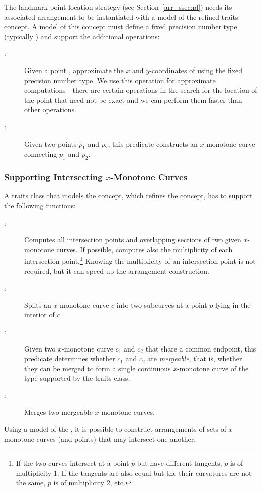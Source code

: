 The landmark point-location strategy (see
Section~\ref{arr_ssec:pl}) needs its associated arrangement to be
instantiated with a model of the refined
 traits concept. A model of this
concept must define a fixed precision number type (typically
) and support the additional operations:
\begin{description}
\item[:]
  Given a point , approximate the $x$ and $y$-coordinates
  of  using the fixed precision number type. We use this
  operation for approximate computations---there are certain
  operations in the search for the location of the point that need not
  be exact and we can perform them faster than other operations.
%
\item[:] Given two points $p_1$ and
  $p_2$, this predicate constructs an $x$-monotone curve connecting
  $p_1$ and $p_2$.
\end{description}

\subsubsection{Supporting Intersecting $x$-Monotone Curves
\label{arr_sssec:tr_xmon_concept}}

A traits class that models the 
concept, which refines the 
concept, has to support the following functions:
\begin{description}
\item[:]
  Computes all intersection points and overlapping sections of
  two given $x$-monotone curves. If possible, computes also the
  multiplicity of each intersection point.\footnote{If the two
    curves intersect at a point $p$ but have different tangents, $p$
    is of multiplicity 1. If the tangents are also equal but the their
    curvatures are not the same, $p$ is of multiplicity 2, etc.}
  Knowing the multiplicity of an intersection point is not required,
  but it can speed up the arrangement construction.
%
\item[:] Splits an $x$-monotone curve $c$ into two subcurves
  at a point $p$ lying in the interior of $c$.
%
\item[:] Given two $x$-monotone curve $c_1$ and
  $c_2$ that share a common endpoint, this predicate determines
  whether $c_1$ and $c_2$ are \emph{mergeable}, that is, whether they
  can be merged to form a single continuous $x$-monotone curve of the
  type supported by the traits class.
%
\item[:] Merges two mergeable $x$-monotone curves.
\end{description}
Using a model of the , it is
possible to construct arrangements of sets of $x$-monotone curves
(and points) that may intersect one another.

